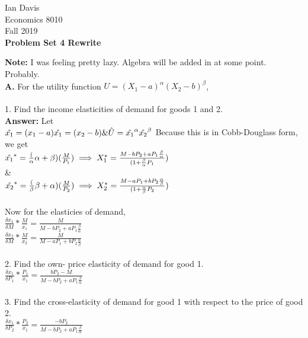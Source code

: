 \documentclass[11pt]{article}
\begin{document}
\begin{flushleft}
Ian Davis\\
Economics 8010\\
Fall 2019\\
\bigskip
\textbf{Problem Set 4 Rewrite}\\
\end{flushleft}
\textbf{Note: }I was feeling pretty lazy. Algebra will be added in at some point. Probably.\\
\textbf{A. } For the utility function $U = (X_1 - a)^\alpha (X_2 - b)^\beta$,\\
\\
1. Find the income elasticities of demand for goods 1 and 2.\\
\textbf{Answer: } Let\\
$\hat{x_1} = (x_1-a)\\
\hat{x_1} = (x_2-b)\\
\&\\
\hat{U} = \hat{x_1}^\alpha \hat{x_2}^\beta$
Because this is in Cobb-Douglass form, we get\\
$\hat{x_1}^* = \frac({\alpha}{\alpha + \beta})(\frac{M}{P_1})\\
\implies X_1^* = \frac{M - bP_2 + aP_1\frac{\beta}{\alpha}}{(1 + \frac{\beta}{\alpha}P_1})$\\
\&\\
$\hat{x_2}^* = \frac({\beta}{\beta + \alpha})(\frac{M}{P_2})\\
\implies X_2^* =  \frac{M - aP_1 + bP_2\frac{\alpha}{\beta}}{(1 + \frac{\alpha}{\beta}P_2})$\\
\\
Now for the elasticies of demand,\\
$\frac{\delta x_1}{\delta M} * \frac{M}{x_1} = \frac{M}{M - bP_2 + aP_1\frac{\beta}{\alpha}}$\\
$\frac{\delta x_2}{\delta M} * \frac{M}{x_2} = \frac{M}{M - aP_1 + bP_2\frac{\alpha}{\beta}}$\\
\\
2. Find the own- price elasticity of demand for good 1.\\
$\frac{\delta x_1}{\delta P_1} * \frac{P_1}{x_1} = \frac{bP_2 - M}{M - bP_2 + aP_1\frac{\beta}{\alpha}}$\\
\\
3. Find the cross-elasticity of demand for good 1 with respect to the price of good 2.\\
$\frac{\delta x_1}{\delta P_2} * \frac{P_2}{x_1} = \frac{- bP_2}{M - bP_2 + aP_1\frac{\beta}{\alpha}}$\\
\end{document}
